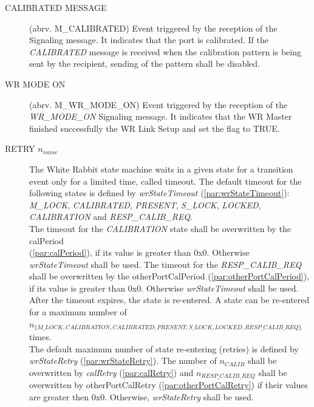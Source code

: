 \documentclass[a4paper, 12pt]{article}
\begin{document}
\begin{description}

\item[CALIBRATED MESSAGE] 		(abrv. M\_CALIBRATED)		Event triggered by the 
      reception of the   Signaling message. It indicates that the port is 
      calibrated. If the \textit{CALIBRATED} message is received when the calibration pattern is 
      being sent by the recipient, sending of the pattern shall be disabled. 

\item[WR MODE ON] 			(abrv. M\_WR\_MODE\_ON)		Event triggered by the 
      reception of the \textit{WR\_MODE\_ON} Signaling message. It indicates that the WR Master 
      finished successfully the WR Link Setup and set the  flag to TRUE. 

\item[RETRY $n_{name}$]	The White Rabbit state
      machine waits in a given state for a transition event only for a limited time, called timeout.
      The default timeout for the following states is defined by \textit{wrStateTimeout} 
      (\ref{par:wrStateTimeout}): \textit{M\_LOCK}, \textit{CALIBRATED}, \textit{PRESENT}, 
      \textit{S\_LOCK}, \textit{LOCKED}, \textit{CALIBRATION} and \textit{RESP\_CALIB\_REQ}.\\
      The timeout for the  \textit{CALIBRATION} state shall be overwritten by the 
      calPeriod \\ (\ref{par:calPeriod}), if its value is greater than 0x0. Otherwise 
      \textit{wrStateTimeout} shall be used.
      The timeout for the \textit{RESP\_CALIB\_REQ} shall be overwritten by the otherPortCalPeriod 
      (\ref{par:otherPortCalPeriod}), if its value is greater than 0x0. Otherwise 
      \textit{wrStateTimeout} shall be used.\\
      After the timeout expires, the state is re-entered. A state can be re-entered for a maximum 
      number of   
      $n_{\{M\_LOCK, CALIBRATION, CALIBRATED, PRESENT, S\_LOCK, LOCKED, RESP\_CALIB\_REQ\}}$ times.\\
      The default maximum number of state re-entering (retries) is defined by \textit{wrStateRetry} 
      (\ref{par:wrStateRetry}). The number of $n_{CALIB}$ shall be overwritten by \textit{calRetry} 
      (\ref{par:calRetry}) and $n_{RESP\_CALIB\_REQ}$ shall be overwritten by otherPortCalRetry 
      (\ref{par:otherPortCalRetry}) if their values are greater then 0x0. Otherwise, 
      \textit{wrStateRetry} shall be used.


\end{description}
\end{document}
